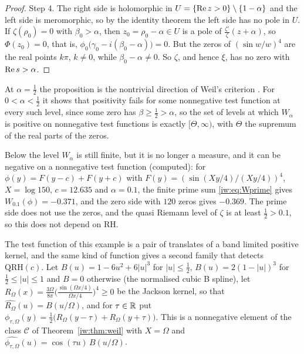 \begin{proof}
Step 4. The right side is holomorphic in $U=\{\operatorname{Re} z>0\}\setminus\{1-\alpha\}$ and the left side is meromorphic, so by the identity theorem the left side has no pole in $U$. If $\zeta(\rho_0)=0$ with $\beta_0>\alpha$, then $z_0=\rho_0-\alpha\in U$ is a pole of $\frac{\zeta'}\zeta(z+\alpha)$, so $\Phi(z_0)=0$, that is, $\phi_0\big(\gamma_0-i(\beta_0-\alpha)\big)=0$. But the zeros of $(\sin w/w)^4$ are the real points $k\pi$, $k\ne0$, while $\beta_0-\alpha\ne0$. So $\zeta$, and hence $\xi$, has no zero with $\operatorname{Re} s>\alpha$.
\end{proof}

At $\alpha=\frac12$ the proposition is the nontrivial direction of Weil's criterion \cite{Weil52,Bombieri}. For $0<\alpha<\frac12$ it shows that positivity fails for some nonnegative test function at every such level, since some zero has $\beta\ge\frac12>\alpha$, so the set of levels at which $W_\alpha$ is positive on nonnegative test functions is exactly $[\Theta,\infty)$, with $\Theta$ the supremum of the real parts of the zeros.

Below the level $W_\alpha$ is still finite, but it is no longer a measure, and it can be negative on a nonnegative test function (computed): for $\phi(y)=F(y-c)+F(y+c)$ with $F(y)=(\sin(Xy/4)/(Xy/4))^4$, $X=\log150$, $c=12.635$ and $\alpha=0.1$, the finite prime sum \eqref{iw:eq:Wprime} gives $W_{0.1}(\phi)=-0.371$, and the zero side with $120$ zeros gives $-0.369$. The prime side does not use the zeros, and the quasi Riemann level of $\zeta$ is at least $\frac12>0.1$, so this does not depend on RH.


The test function of this example is a pair of translates of a band limited positive kernel, and the same kind of function gives a second family that detects $\mathrm{QRH}(c)$. Let $B(u)=1-6u^2+6|u|^3$ for $|u|\le\tfrac12$, $B(u)=2(1-|u|)^3$ for $\tfrac12\le|u|\le1$ and $B=0$ otherwise (the normalised cubic B spline), let $R_\Omega(x)=\frac{3\Omega}{8\pi}\bigl(\frac{\sin(\Omega x/4)}{\Omega x/4}\bigr)^4\ge0$ be the Jackson kernel, so that $\widehat{R_\Omega}(u)=B(u/\Omega)$, and for $\tau\in\mathbb{R}$ put $\phi_{\tau,\Omega}(y)=\tfrac12\bigl(R_\Omega(y-\tau)+R_\Omega(y+\tau)\bigr)$. This is a nonnegative element of the class $\mathcal C$ of Theorem~\ref{iw:thm:weil} with $X=\Omega$ and $\widehat{\phi_{\tau,\Omega}}(u)=\cos(\tau u)\,B(u/\Omega)$.

